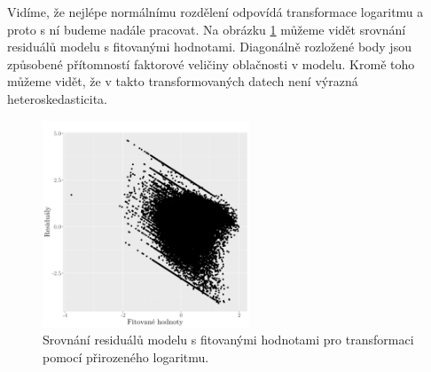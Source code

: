 Vidíme, že nejlépe normálnímu rozdělení odpovídá transformace logaritmu a proto s ní budeme nadále pracovat. Na obrázku \ref{fig:resvsfit_log} můžeme vidět srovnání residuálů modelu s fitovanými hodnotami. Diagonálně rozložené body jsou způsobené přítomností faktorové veličiny oblačnosti v modelu. Kromě toho můžeme vidět, že v takto transformovaných datech není výrazná heteroskedasticita.

\begin{figure}
	\centering
  \includegraphics[width=0.55\textwidth]{img/ch2/modmax15cm_log.png}
	\caption{Srovnání residuálů modelu s fitovanými hodnotami pro transformaci pomocí přirozeného logaritmu.}
	\label{fig:resvsfit_log}
\end{figure}

